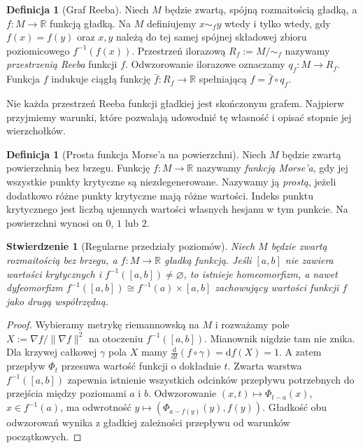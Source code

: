\documentclass[11pt,a4paper]{report}
\numberwithin{equation}{section}
\theoremstyle{plain}
\newtheorem{stwierdzenie}[twierdzenie]{Stwierdzenie}
\theoremstyle{definition}
\newtheorem{definicja}[twierdzenie]{Definicja}
\theoremstyle{remark}
\begin{document}
\begin{definicja}[Graf Reeba]
Niech $M$ będzie zwartą, spójną rozmaitością gładką,
a $f:M\to\mathbb R$ funkcją gładką. Na $M$ definiujemy
$x\sim_f y$ wtedy i tylko wtedy, gdy $f(x)=f(y)$
oraz $x,y$ należą do tej samej spójnej składowej
zbioru poziomicowego $f^{-1}(f(x))$.
Przestrzeń ilorazową $R_f:=M/{\sim_f}$ nazywamy
\emph{przestrzenią Reeba} funkcji $f$. Odwzorowanie
ilorazowe oznaczamy $q_f:M\to R_f$.
Funkcja $f$ indukuje ciągłą funkcję
$\bar f:R_f\to\mathbb R$ spełniającą
$f=\bar f\circ q_f$.
\end{definicja}

Nie każda przestrzeń Reeba funkcji gładkiej jest
skończonym grafem. Najpierw przyjmiemy warunki,
które pozwalają udowodnić tę własność i opisać
stopnie jej wierzchołków.

\begin{definicja}[Prosta funkcja Morse'a na powierzchni]
Niech $M$ będzie zwartą powierzchnią bez brzegu.
Funkcję $f:M\to\mathbb R$ nazywamy \emph{funkcją Morse'a},
gdy jej wszystkie punkty krytyczne są niezdegenerowane.
Nazywamy ją \emph{prostą}, jeżeli dodatkowo różne punkty
krytyczne mają różne wartości. Indeks punktu krytycznego
jest liczbą ujemnych wartości własnych hesjanu w tym punkcie.
Na powierzchni wynosi on $0$, $1$ lub $2$.
\end{definicja}

\begin{stwierdzenie}[Regularne przedziały poziomów]
Niech $M$ będzie zwartą rozmaitością bez brzegu,
a $f:M\to\mathbb R$ gładką funkcją. Jeśli
$[a,b]$ nie zawiera wartości krytycznych i
$f^{-1}([a,b])\ne\varnothing$, to istnieje
homeomorfizm, a nawet dyfeomorfizm
$f^{-1}([a,b])\cong f^{-1}(a)\times[a,b]$
zachowujący wartości funkcji $f$ jako drugą współrzędną.
\end{stwierdzenie}

\begin{proof}
Wybieramy metrykę riemannowską na $M$ i rozważamy
pole $X:=\nabla f/\|\nabla f\|^2$ na otoczeniu
$f^{-1}([a,b])$. Mianownik nigdzie tam nie znika.
Dla krzywej całkowej $\gamma$ pola $X$ mamy
$\frac{\mathrm d}{\mathrm dt}(f\circ\gamma)
=\mathrm df(X)=1$.
A zatem przepływ $\Phi_t$ przesuwa wartość funkcji
o dokładnie $t$. Zwarta warstwa $f^{-1}([a,b])$
zapewnia istnienie wszystkich odcinków przepływu
potrzebnych do przejścia między poziomami $a$ i $b$.
Odwzorowanie $(x,t)\mapsto\Phi_{t-a}(x)$,
$x\in f^{-1}(a)$, ma odwrotność
$y\mapsto(\Phi_{a-f(y)}(y),f(y))$.
Gładkość obu odwzorowań wynika z gładkiej zależności
przepływu od warunków początkowych.
\end{proof}
\end{document}
